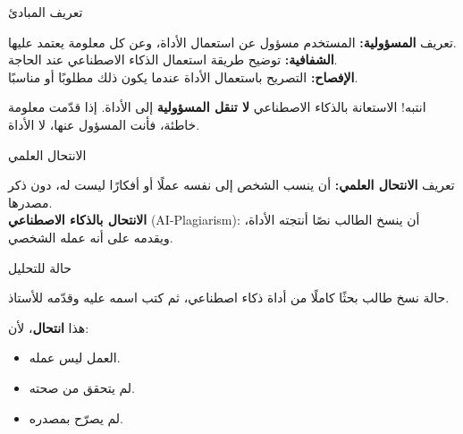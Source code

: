 \documentclass[aspectratio=169, 11pt, xcolor={table}]{beamer}
\begin{document}
\begin{frame}{تعريف المبادئ}
    \begin{tbox}{\faLightbulb\quad تعريف}
        \textbf{المسؤولية:} المستخدم مسؤول عن استعمال الأداة، وعن كل معلومة يعتمد عليها.\\[2pt]
        \textbf{الشفافية:} توضيح طريقة استعمال الذكاء الاصطناعي عند الحاجة.\\[2pt]
        \textbf{الإفصاح:} التصريح باستعمال الأداة عندما يكون ذلك مطلوبًا أو مناسبًا.
    \end{tbox}
    \begin{obox}{\faExclamationTriangle\quad انتبه!}
        الاستعانة بالذكاء الاصطناعي \textbf{لا تنقل المسؤولية} إلى الأداة.
        إذا قدّمت معلومة خاطئة، فأنت المسؤول عنها، لا الأداة.
    \end{obox}
\end{frame}

\begin{frame}{الانتحال العلمي}
    \begin{tbox}{\faLightbulb\quad تعريف}
        \textbf{الانتحال العلمي:} أن ينسب الشخص إلى نفسه عملًا أو أفكارًا ليست له،
        دون ذكر مصدرها.\\[3pt]
        \textbf{الانتحال بالذكاء الاصطناعي} \textenglish{(AI-Plagiarism)}:
        أن ينسخ الطالب نصًا أنتجته الأداة، ويقدمه على أنه عمله الشخصي.
    \end{tbox}
\end{frame}

\begin{frame}{حالة للتحليل}
    \begin{obox}{\faExclamationTriangle\quad حالة}
        نسخ طالب بحثًا كاملًا من أداة ذكاء اصطناعي، ثم كتب اسمه عليه وقدّمه للأستاذ.
    \end{obox}
    هذا \textbf{انتحال}، لأن:
    \begin{itemize}
        \item العمل ليس عمله.
        \item لم يتحقق من صحته.
        \item لم يصرّح بمصدره.
    \end{itemize}
\end{frame}
\end{document}
